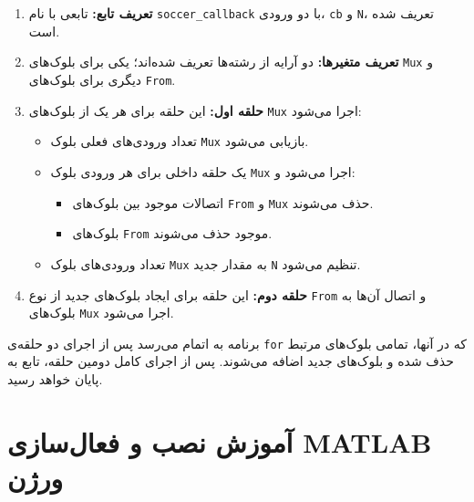 \begin{enumerate}
	\item \textbf{تعریف تابع:} تابعی با نام \texttt{soccer\_callback} با دو ورودی، \texttt{cb} و \texttt{N}، تعریف شده است.
	\item \textbf{تعریف متغیر‌ها:} دو آرایه از رشته‌ها تعریف شده‌اند؛ یکی برای بلوک‌های \texttt{Mux} و دیگری برای بلوک‌های \texttt{From}.
	\item \textbf{حلقه اول:} این حلقه برای هر یک از بلوک‌های \texttt{Mux} اجرا می‌شود:
	\begin{itemize}
		\item تعداد ورودی‌های فعلی بلوک \texttt{Mux} بازیابی می‌شود.
		\item یک حلقه داخلی برای هر ورودی بلوک \texttt{Mux} اجرا می‌شود و:
		\begin{itemize}
			\item اتصالات موجود بین بلوک‌های \texttt{From} و \texttt{Mux} حذف می‌شوند.
			\item بلوک‌های \texttt{From} موجود حذف می‌شوند.
		\end{itemize}
		\item تعداد ورودی‌های بلوک \texttt{Mux} به مقدار جدید \texttt{N} تنظیم می‌شود.
	\end{itemize}
	\item \textbf{حلقه دوم:} این حلقه برای ایجاد بلوک‌های جدید از نوع \texttt{From} و اتصال آن‌ها به بلوک‌های \texttt{Mux} اجرا می‌شود.
\end{enumerate}

برنامه به اتمام می‌رسد پس از اجرای دو حلقه‌ی \texttt{for} که در آنها، تمامی بلوک‌های مرتبط حذف شده و بلوک‌های جدید اضافه می‌شوند. پس از اجرای کامل دومین حلقه، تابع به پایان خواهد رسید.


\newpage

\section*{آموزش نصب و فعال‌سازی MATLAB ورژن }

